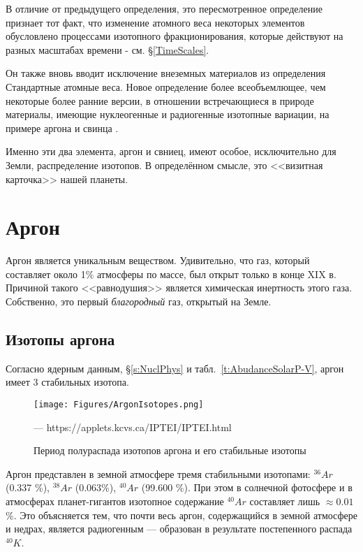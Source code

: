 \documentclass[a5paper,openany]{book}
\begin{document}
В отличие от предыдущего определения, это пересмотренное определение признает тот факт, что изменение
атомного веса некоторых элементов обусловлено процессами изотопного фракционирования, которые действуют на разных масштабах времени - см. \S\ref{TimeScales}.

Он также вновь вводит исключение внеземных материалов из определения Стандартные атомные веса. Новое определение более всеобъемлющее, чем некоторые более ранние версии, в отношении
встречающиеся в природе материалы, имеющие нуклеогенные и радиогенные изотопные вариации, на примере аргона
\cite{IUPACArgon} и свинца \cite{IUPACLead}.

Именно эти два элемента, аргон и свниец, имеют особое, исключительно для Земли, распределение изотопов. В определённом смысле, это <<визитная карточка>> нашей планеты.

\section{Аргон} \label{s:Argon}

Аргон является уникальным веществом. Удивительно, что газ, который составляет около 1\% атмосферы по массе, был открыт только в конце XIX в. Причиной такого <<равнодушия>> является химическая инертность этого газа. Собственно, это первый \emph{благородный} газ, открытый на Земле. 

\subsection{Изотопы аргона} \label{s:ArgonIsotopes}

Согласно ядерным данным, \S\ref{s:NuclPhys} и табл.~\ref{t:AbudanceSolarP-V}, аргон имеет 3 стабильных изотопа.
\begin{figure}[ht] 
	\centering\small
	\texttt{[image: Figures/ArgonIsotopes.png]}
	\caption{Период полураспада изотопов аргона и его стабильные изотопы} --- https://applets.kcvs.ca/IPTEI/IPTEI.html
	\label{f:ArgonIsotopes}
\end{figure}


Аргон представлен в земной атмосфере тремя стабильными изотопами: $^{36}Ar$ (0.337 \%), $^{38}Ar$ (0.063\%), $^{40}Ar$ (99.600 \%). При этом в солнечной фотосфере и в атмосферах планет-гигантов изотопное содержание $^{40}Ar$ составляет лишь $\approx 0.01$ \%. Это объясняется тем, что почти весь аргон, содержащийся в земной атмосфере и недрах, является радиогенным — образован в результате постепенного распада $^{40}K$.
\end{document}
